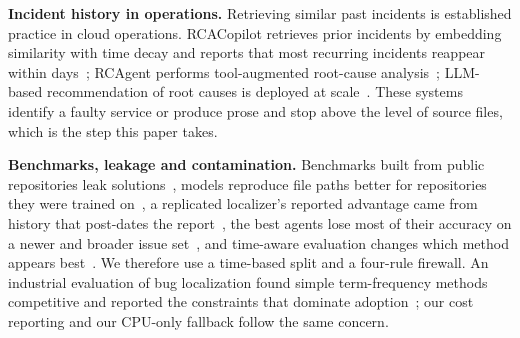 \textbf{Incident history in operations.} Retrieving similar past
incidents is established practice in cloud operations. RCACopilot
retrieves prior incidents by embedding similarity with time decay and
reports that most recurring incidents reappear within
days~\cite{chen2024rcacopilot}; RCAgent performs tool-augmented
root-cause analysis~\cite{wang2024rcagent}; LLM-based recommendation
of root causes is deployed at scale~\cite{ahmed2023rootcause}. These
systems identify a faulty service or produce prose and stop above the
level of source files, which is the step this paper takes.

\textbf{Benchmarks, leakage and contamination.} Benchmarks built from
public repositories leak solutions~\cite{aleithan2024swebenchplus},
models reproduce file paths better for repositories they were trained
on~\cite{liang2025illusion}, a replicated localizer's reported advantage
came from history that post-dates the report~\cite{niu2026ablots}, the
best agents lose most of their accuracy on a newer and broader issue
set~\cite{zhang2025mulocbench}, and time-aware evaluation changes
which method appears best~\cite{ledel2021broccoli}. We therefore use a
time-based split and a four-rule firewall. An industrial evaluation of
bug localization found simple term-frequency methods competitive and
reported the constraints that dominate adoption~\cite{hall2026industrial};
our cost reporting and our CPU-only fallback follow the same concern.
